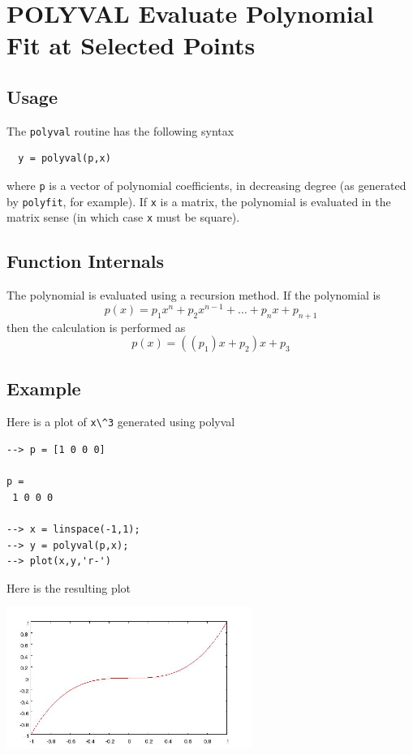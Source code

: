 \section{POLYVAL Evaluate Polynomial Fit at Selected Points}

\subsection{Usage}

The \verb|polyval| routine has the following syntax
\begin{verbatim}
  y = polyval(p,x)
\end{verbatim}
where \verb|p| is a vector of polynomial coefficients,
in decreasing degree (as generated by \verb|polyfit|, for example).
If \verb|x| is a matrix, the polynomial is evaluated in the matrix
sense (in which case \verb|x| must be square).
\subsection{Function Internals}

The polynomial is evaluated using a recursion method.  If the
polynomial is
\[
   p(x) = p_1 x^n + p_2 x^{n-1} + \dots + p_n x + p_{n+1}
\]
then the calculation is performed as
\[
   p(x) = ((p_1) x + p_2) x + p_3
\]
\subsection{Example}

Here is a plot of \verb|x\^3| generated using polyval
\begin{verbatim}
--> p = [1 0 0 0]

p = 
 1 0 0 0 

--> x = linspace(-1,1);
--> y = polyval(p,x);
--> plot(x,y,'r-')
\end{verbatim}
Here is the resulting plot


\centerline{\includegraphics[width=8cm]{polyval1}}

